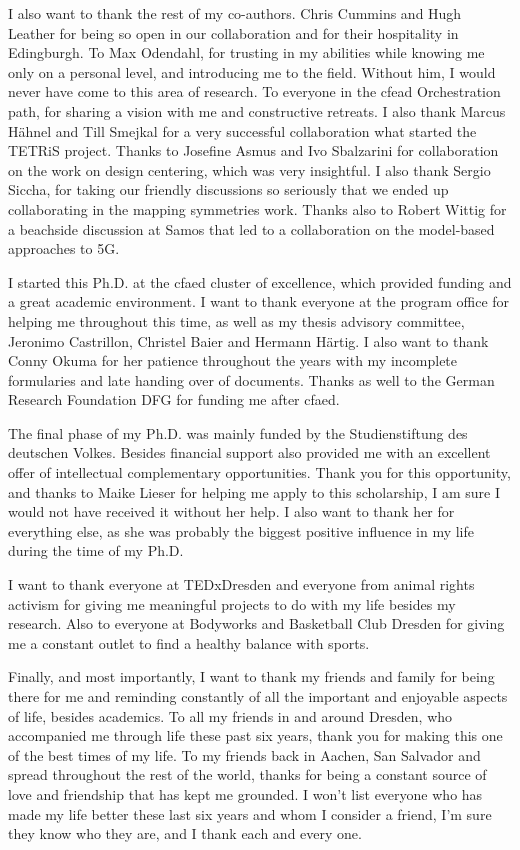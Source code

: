 I also want to thank the rest of my co-authors. Chris Cummins and Hugh Leather for being so open in our collaboration and for their hospitality in Edingburgh. 
To Max Odendahl, for trusting in my abilities while knowing me only on a personal level, and introducing me to the field. Without him, I would never have come to this area of research.
To everyone in the cfead Orchestration path, for sharing a vision with me and constructive retreats.
I also thank Marcus Hähnel and Till Smejkal for a very successful collaboration what started the \acs*{TETRiS} project.
Thanks to Josefine Asmus and Ivo Sbalzarini for collaboration on the work on design centering, which was very insightful.
I also thank Sergio Siccha, for taking our friendly discussions so seriously that we ended up collaborating in the mapping symmetries work.
Thanks also to Robert Wittig for a beachside discussion at Samos that led to a collaboration on the model-based approaches to 5G.

I started this Ph.D. at the \ac{cfaed} cluster of excellence, which provided funding and a great academic environment.
I want to thank everyone at the program office for helping me throughout this time, as well as my thesis advisory committee, Jeronimo Castrillon, Christel Baier and Hermann Härtig.
I also want to thank Conny Okuma for her patience throughout the years with my incomplete formularies and late handing over of documents.
Thanks as well to the German Research Foundation DFG for funding me after \ac{cfaed}.

The final phase of my Ph.D. was mainly funded by the Studienstiftung des deutschen Volkes.
Besides financial support also provided me with an excellent offer of intellectual complementary opportunities.
Thank you for this opportunity, and thanks to Maike Lieser for helping me apply to this scholarship, I am sure I would not have received it without her help.
I also want to thank her for everything else, as she was probably the biggest positive influence in my life during the time of my Ph.D.

I want to thank everyone at TEDxDresden and everyone from animal rights activism for giving me meaningful projects to do with my life besides my research. 
Also to everyone at Bodyworks and Basketball Club Dresden for giving me a constant outlet to find a healthy balance with sports.

Finally, and most importantly, I want to thank my friends and family for being there for me and reminding constantly of all the important and enjoyable aspects of life, besides academics.
To all my friends in and around Dresden, who accompanied me through life these past six years, thank you for making this one of the best times of my life. 
To my friends back in Aachen, San Salvador and spread throughout the rest of the world, thanks for being a constant source of love and friendship that has kept me grounded.
I won't list everyone who has made my life better these last six years and whom I consider a friend, I'm sure they know who they are, and I thank each and every one.

